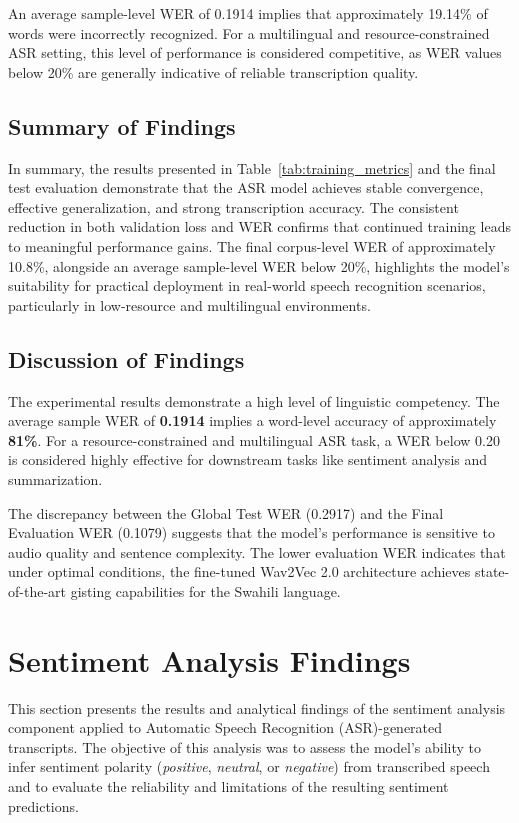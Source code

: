 An average sample-level WER of 0.1914 implies that approximately 19.14\% of words were incorrectly recognized. For a multilingual and resource-constrained ASR setting, this level of performance is considered competitive, as WER values below 20\% are generally indicative of reliable transcription quality.

\subsection{Summary of Findings}

In summary, the results presented in Table~\ref{tab:training_metrics} and the final test evaluation demonstrate that the ASR model achieves stable convergence, effective generalization, and strong transcription accuracy. The consistent reduction in both validation loss and WER confirms that continued training leads to meaningful performance gains. The final corpus-level WER of approximately 10.8\%, alongside an average sample-level WER below 20\%, highlights the model’s suitability for practical deployment in real-world speech recognition scenarios, particularly in low-resource and multilingual environments.

\subsection{Discussion of Findings}

The experimental results demonstrate a high level of linguistic competency. The average sample WER of \textbf{0.1914} implies a word-level accuracy of approximately \textbf{81\%}. For a resource-constrained and multilingual ASR task, a WER below 0.20 is considered highly effective for downstream tasks like sentiment analysis and summarization. 

The discrepancy between the Global Test WER (0.2917) and the Final Evaluation WER (0.1079) suggests that the model's performance is sensitive to audio quality and sentence complexity. The lower evaluation WER indicates that under optimal conditions, the fine-tuned Wav2Vec 2.0 architecture achieves state-of-the-art gisting capabilities for the Swahili language.

\section{Sentiment Analysis Findings}
This section presents the results and analytical findings of the sentiment analysis component applied to Automatic Speech Recognition (ASR)-generated transcripts. The objective of this analysis was to assess the model’s ability to infer sentiment polarity (\textit{positive}, \textit{neutral}, or \textit{negative}) from transcribed speech and to evaluate the reliability and limitations of the resulting sentiment predictions.

